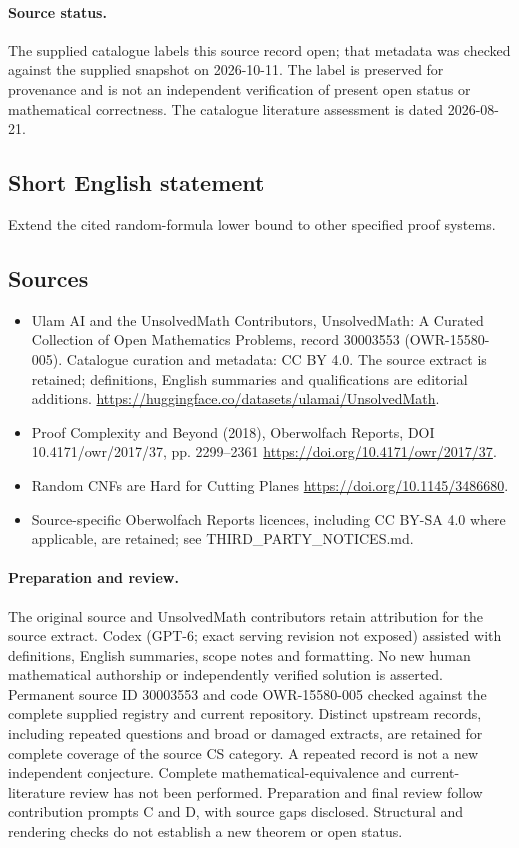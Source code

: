 \documentclass[11pt]{article}
\begin{document}
\paragraph{Source status.}
The supplied catalogue labels this source record open; that metadata was checked against the supplied snapshot on 2026-10-11. The label is preserved for provenance and is not an independent verification of present open status or mathematical correctness. The catalogue literature assessment is dated 2026-08-21.
\subsection{Short English statement}
Extend the cited random-formula lower bound to other specified proof systems.
\subsection{Sources}
\begin{itemize}
\item[\hypertarget{source:30003553:1}{S1}] Ulam AI and the UnsolvedMath Contributors, UnsolvedMath: A Curated Collection of Open Mathematics Problems, record 30003553 (OWR-15580-005). Catalogue curation and metadata: CC BY 4.0. The source extract is retained; definitions, English summaries and qualifications are editorial additions.
\url{https://huggingface.co/datasets/ulamai/UnsolvedMath}.
\item[\hypertarget{source:30003553:2}{S2}] Proof Complexity and Beyond (2018), Oberwolfach Reports, DOI 10.4171/owr/2017/37, pp. 2299--2361
\url{https://doi.org/10.4171/owr/2017/37}.
\item[\hypertarget{source:30003553:3}{S3}] Random CNFs are Hard for Cutting Planes
\url{https://doi.org/10.1145/3486680}.
\item Source-specific Oberwolfach Reports licences, including CC BY-SA 4.0 where applicable, are retained; see THIRD\_PARTY\_NOTICES.md.
\end{itemize}
\paragraph{Preparation and review.}
The original source and UnsolvedMath contributors retain attribution for the source extract. Codex (GPT-6; exact serving revision not exposed) assisted with definitions, English summaries, scope notes and formatting. No new human mathematical authorship or independently verified solution is asserted. Permanent source ID 30003553 and code OWR-15580-005 checked against the complete supplied registry and current repository. Distinct upstream records, including repeated questions and broad or damaged extracts, are retained for complete coverage of the source CS category. A repeated record is not a new independent conjecture. Complete mathematical-equivalence and current-literature review has not been performed. Preparation and final review follow contribution prompts C and D, with source gaps disclosed. Structural and rendering checks do not establish a new theorem or open status.
\label{end:30003553}
\end{document}
